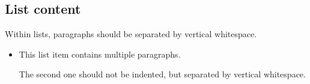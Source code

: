 \documentclass[
  letterpaper,
  DIV=11,
  numbers=noendperiod]{scrartcl}
\begin{document}
\hypertarget{list-content}{%
\subsection{List content}\label{list-content}}

Within lists, paragraphs should be separated by vertical whitespace.

\begin{itemize}
\item
  This list item contains multiple paragraphs.

  The second one should not be indented, but separated by vertical
  whitespace.
\end{itemize}
\end{document}
